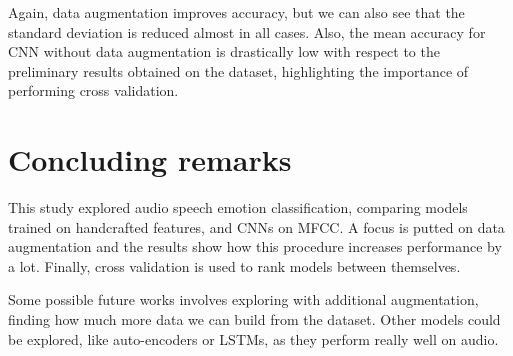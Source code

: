 \noindent Again, data augmentation improves accuracy, but we can also see that the standard deviation is reduced
almost in all cases.
Also, the mean accuracy for CNN without data augmentation is drastically low 
with respect to the preliminary results obtained on the dataset, highlighting the importance
of performing cross validation.

\section{Concluding remarks}

This study explored audio speech emotion classification, comparing 
models trained on handcrafted features, and CNNs on MFCC.
A focus is putted on data augmentation and the results 
show how this procedure increases performance by a lot. 
Finally, cross validation is used to rank models between themselves.

Some possible future works involves exploring with additional 
augmentation, finding how much more data we can build from the dataset. 
Other models could be explored, like auto-encoders or LSTMs, as 
they perform really well on audio.